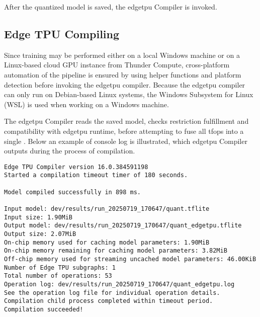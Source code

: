 {After the quantized model is saved, the \gls{edgetpu} Compiler is invoked.

\subsection*{Edge TPU Compiling}

Since training may be performed either on a local Windows machine or on a Linux-based cloud GPU instance from Thunder Compute,
cross-platform automation of the pipeline is ensured by using helper functions and platform detection before invoking the \gls{edgetpu} compiler.
Because the \gls{edgetpu} compiler can only run on Debian-based Linux systems, the Windows Subsystem for Linux (WSL) is used when working on a Windows machine.


The \gls{edgetpu} Compiler reads the saved  model, checks restriction fulfillment and compatibility with \gls{edgetpu} runtime,
before attempting to fuse all \glspl{tfop} into a single .
Below an example of console log is illustrated, which \gls{edgetpu} Compiler outputs during the process of compilation.


\begin{lstlisting}[style=compilerlog,
    caption={Edge TPU compiler output for the quantized model},
    label={lst:edgetpu_compilation}]
Edge TPU Compiler version 16.0.384591198
Started a compilation timeout timer of 180 seconds.

Model compiled successfully in 898 ms.

Input model: dev/results/run_20250719_170647/quant.tflite
Input size: 1.90MiB
Output model: dev/results/run_20250719_170647/quant_edgetpu.tflite
Output size: 2.07MiB
On-chip memory used for caching model parameters: 1.90MiB
On-chip memory remaining for caching model parameters: 3.82MiB
Off-chip memory used for streaming uncached model parameters: 46.00KiB
Number of Edge TPU subgraphs: 1
Total number of operations: 53
Operation log: dev/results/run_20250719_170647/quant_edgetpu.log
See the operation log file for individual operation details.
Compilation child process completed within timeout period.
Compilation succeeded!
\end{lstlisting}

}
